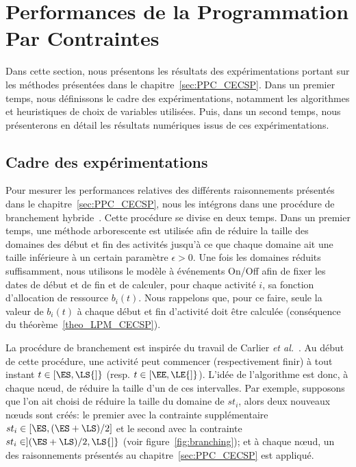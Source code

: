 \section{Performances de la Programmation Par Contraintes}
\label{sec:expe_PPC}
Dans cette section, nous présentons les résultats des expérimentations
portant sur les méthodes présentées dans le
chapitre~\ref{sec:PPC_CECSP}. Dans un premier temps, nous définissons
le cadre des expérimentations, notamment les algorithmes et
heuristiques de choix de variables utilisées. Puis, dans un second
temps, nous présenterons en détail les résultats numériques issus de
ces expérimentations. 

\subsection{Cadre des expérimentations}
\label{sec:hybridBB}
Pour mesurer les performances relatives des différents raisonnements
présentés dans le chapitre~\ref{sec:PPC_CECSP}, nous les intégrons
dans une procédure de branchement
hybride~\cite{Nattaf_Constraints,Nattaf_ORSpectrum}. Cette procédure
se divise en deux temps. Dans un premier temps, une méthode 
arborescente est utilisée afin de réduire la taille des domaines des
début et fin des activités jusqu'à ce que chaque domaine ait une
taille inférieure à un certain paramètre $\epsilon >0$. Une fois les
domaines réduits suffisamment, nous utilisons le modèle à événements 
On/Off afin de fixer les dates de début et de fin et de calculer, pour
chaque activité $i$, sa fonction d'allocation de ressource
$b_i(t)$. Nous rappelons que, pour ce faire, seule la valeur de
$b_i(t)$ à chaque début et fin d'activité doit être calculée
(conséquence du théorème~\ref{theo_LPM_CECSP}).

La procédure de branchement est inspirée du travail de Carlier {\it et
  al.}~\cite{Carlier}. Au début de cette procédure, une activité peut
commencer (respectivement finir) à tout instant $t \in [\ES,\LS{]}$
(resp. $t \in [\EE,\LE{]}$). L'idée de l'algorithme est donc, à chaque
n\oe ud, de réduire la taille d'un de ces intervalles. Par exemple,
supposons que l'on ait choisi de réduire la taille du domaine de
$st_i$, alors deux nouveaux n\oe uds sont créés: le premier avec la
contrainte supplémentaire $st_i \in [\ES , (\ES+\LS) / 2]$ et le
second avec la contrainte $st_i \in ](\ES+\LS) / 2,\LS{]}$ (voir
figure~\ref{fig:branching}); et à chaque n\oe ud, un des raisonnements
présentés au chapitre~\ref{sec:PPC_CECSP} est appliqué.

